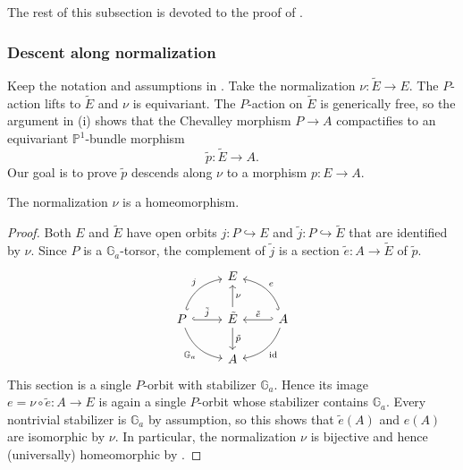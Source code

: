 \documentclass[reqno, letterpaper]{amsart}
\numberwithin{equation}{subsection}
\let\to\longrightarrow
\newcommand{\GG}{\mathbb{G}}
\newcommand{\PP}{\mathbb{P}}
\DeclareMathOperator{\id}{id}
\begin{document}
		The rest of this subsection is devoted to the proof of .
		
		
		\subsubsection{Descent along normalization}
			Keep the notation and assumptions in . Take the normalization $\nu : \tilde E \to E$. The $P$-action lifts to $\tilde E$ and $\nu$ is equivariant. The $P$-action on $\tilde E$ is generically free, so the argument in (i) shows that the Chevalley morphism $P \to A$ compactifies to an equivariant $\PP^1$-bundle morphism
			\[ \tilde p : \tilde E \to A .\]
			Our goal is to prove $\tilde p$ descends along $\nu$ to a morphism $p : E \to A$.
			
			\begin{lemma} \label{lem:prop:integral fiber unstable step 1}
				The normalization $\nu$ is a homeomorphism.
			\end{lemma}
			\begin{proof}
				Both $E$ and $\tilde E$ have open orbits $j : P \hookrightarrow E$ and $\tilde j : P \hookrightarrow \tilde E$ that are identified by $\nu$. Since $P$ is a $\GG_a$-torsor, the complement of $\tilde j$ is a section $\tilde e : A \to \tilde E$ of $\tilde p$.
				\begin{equation} \label{diag:prop:integral fiber unstable}
				\begin{tikzcd}
					& E \\
					P \arrow[r, hook, "\tilde j"] \arrow[ru, hook', bend left=30, "j"] \arrow[rd, bend right=30, "\GG_a"'] & \tilde E \arrow[u, "\nu"'] \arrow[d, "\tilde p"] & A \arrow[l, hook', "\tilde e"'] \arrow[lu, hook, bend right=30, "e"'] \arrow[ld, bend left=30, "\id"]\\
					& A
				\end{tikzcd}
				\end{equation}
				This section is a single $P$-orbit with stabilizer $\GG_a$. Hence its image $e = \nu \circ \tilde e : A \to E$ is again a single $P$-orbit whose stabilizer contains $\GG_a$. Every nontrivial stabilizer is $\GG_a$ by assumption, so this shows that $\tilde e(A)$ and $e(A)$ are isomorphic by $\nu$. In particular, the normalization $\nu$ is bijective and hence (universally) homeomorphic by \cite[Tag~0BRD]{stacks-project}.
			\end{proof}
			
\end{document}

